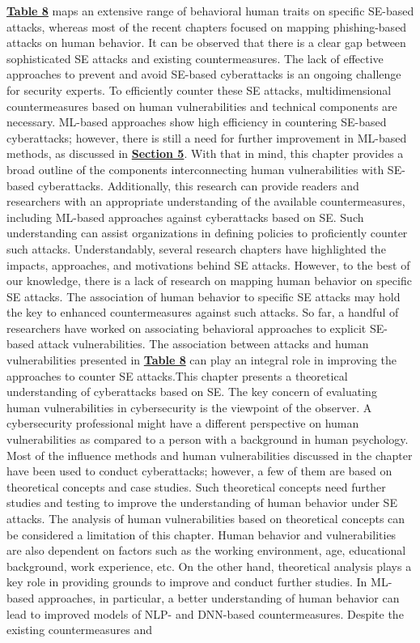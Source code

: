 {\href{https://www.mdpi.com/2076-3417/12/12/6042\#table_body_display_applsci-12-06042-t008}{\textbf{Table 8}} maps an extensive range of behavioral human traits on specific SE-based attacks, whereas most of the recent chapters focused on mapping phishing-based attacks on human behavior. It can be observed that there is a clear gap between sophisticated SE attacks and existing countermeasures. The lack of effective approaches to prevent and avoid SE-based cyberattacks is an ongoing challenge for security experts. To efficiently counter these SE attacks, multidimensional countermeasures based on human vulnerabilities and technical components are necessary. ML-based approaches show high efficiency in countering SE-based cyberattacks; however, there is still a need for further improvement in ML-based methods, as discussed in \href{https://www.mdpi.com/2076-3417/12/12/6042\#sec5-applsci-12-06042}{\textbf{Section 5}}. With that in mind, this chapter provides a broad outline of the components interconnecting human vulnerabilities with SE-based cyberattacks. Additionally, this research can provide readers and researchers with an appropriate understanding of the available countermeasures, including ML-based approaches against cyberattacks based on SE. Such understanding can assist organizations in defining policies to proficiently counter such attacks. Understandably, several research chapters have highlighted the impacts, approaches, and motivations behind SE attacks. However, to the best of our knowledge, there is a lack of research on mapping human behavior on specific SE attacks. The association of human behavior to specific SE attacks may hold the key to enhanced countermeasures against such attacks. So far, a handful of researchers have worked on associating behavioral approaches to explicit SE-based attack vulnerabilities. The association between attacks and human vulnerabilities presented in \href{https://www.mdpi.com/2076-3417/12/12/6042\#table_body_display_applsci-12-06042-t008}{\textbf{Table 8}} can play an integral role in improving the approaches to counter SE attacks.This chapter presents a theoretical understanding of cyberattacks based on SE. The key concern of evaluating human vulnerabilities in cybersecurity is the viewpoint of the observer. A cybersecurity professional might have a different perspective on human vulnerabilities as compared to a person with a background in human psychology. Most of the influence methods and human vulnerabilities discussed in the chapter have been used to conduct cyberattacks; however, a few of them are based on theoretical concepts and case studies. Such theoretical concepts need further studies and testing to improve the understanding of human behavior under SE attacks. The analysis of human vulnerabilities based on theoretical concepts can be considered a limitation of this chapter. Human behavior and vulnerabilities are also dependent on factors such as the working environment, age, educational background, work experience, etc. On the other hand, theoretical analysis plays a key role in providing grounds to improve and conduct further studies. In ML-based approaches, in particular, a better understanding of human behavior can lead to improved models of NLP- and DNN-based countermeasures. Despite the existing countermeasures and }
